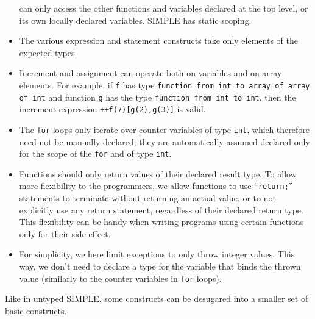 \begin{latexComment}
\begin{itemize}
can only access the other functions and variables declared at the top level,
or its own locally declared variables.  SIMPLE has static scoping.
\item The various expression and statement constructs take only elements of
the expected types.
\item Increment and assignment can operate both on variables and on array
elements.  For example, if \texttt{f} has type
\texttt{function from int to array of array of int} and function
\texttt{g} has the type \texttt{function from int to int}, then the
increment expression \texttt{++f(7)[g(2),g(3)]} is valid.
\item The \texttt{for} loops only iterate over counter variables of type
\texttt{int}, which therefore need not be manually declared; they are
automatically assumed declared only for the scope of the \texttt{for} and of
type \texttt{int}.
\item Functions should only return values of their declared result type.
To allow more flexibility to the programmers, we allow functions to use
``\texttt{return;}'' statements to terminate without returning an actual
value, or to not explicitly use any return statement, regardless of their
declared return type.  This flexibility can be handy when writing programs
using certain functions only for their side effect.
\item For simplicity, we here limit exceptions to only throw integer values.
This way, we don't need to declare a type for the variable that binds the
thrown value (similarly to the counter variables in \texttt{for} loops).
\end{itemize}
Like in untyped SIMPLE, some constructs can be desugared into a smaller set of
basic constructs.
\end{latexComment}

\vspace*{3ex}
